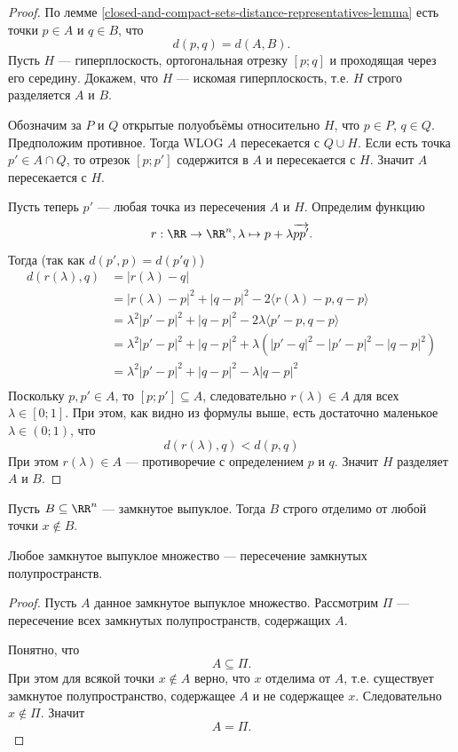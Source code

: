 \documentclass[12pt,a4paper]{article}
\begin{document}
    \begin{proof}
        По лемме \ref{closed-and-compact-sets-distance-representatives-lemma} есть точки $p \in A$ и $q \in B$, что
        \[d(p, q) = d(A, B).\]
        Пусть $H$ --- гиперплоскость, ортогональная отрезку $[p;q]$ и проходящая через его середину. Докажем, что $H$ --- искомая гиперплоскость, т.е. $H$ строго разделяется $A$ и $B$.

        Обозначим за $P$ и $Q$ открытые полуобъёмы относительно $H$, что $p \in P$, $q \in Q$. Предположим противное. Тогда WLOG $A$ пересекается с $Q \cup H$. Если есть точка $p' \in A \cap Q$, то отрезок $[p;p']$ содержится в $A$ и пересекается с $H$. Значит $A$ пересекается с $H$.

        Пусть теперь $p'$ --- любая точка из пересечения $A$ и $H$. Определим функцию
        \[r: \RR \to \RR^n, \lambda \mapsto p + \lambda \overrightarrow{pp'}.\]
        Тогда (так как $d(p', p) = d(p' q)$)
        \begin{align*}
            d(r(\lambda), q)
            &= |r(\lambda) - q|\\
            &= |r(\lambda) - p|^2 + |q - p|^2 - 2\langle r(\lambda) - p, q - p \rangle\\
            &= \lambda^2 |p' - p|^2 + |q - p|^2 - 2 \lambda \langle p' - p, q - p \rangle\\
            &= \lambda^2 |p' - p|^2 + |q - p|^2 + \lambda(|p' - q|^2 - |p' - p|^2 - |q - p|^2)\\
            &= \lambda^2 |p' - p|^2 + |q - p|^2 - \lambda|q - p|^2\\
        \end{align*}
        Поскольку $p, p' \in A$, то $[p; p'] \subseteq A$, следовательно $r(\lambda) \in A$ для всех $\lambda \in [0; 1]$. При этом, как видно из формулы выше, есть достаточно маленькое $\lambda \in (0; 1)$, что
        \[d(r(\lambda), q) < d(p, q)\]
        При этом $r(\lambda) \in A$ --- противоречие с определением $p$ и $q$. Значит $H$ разделяет $A$ и $B$.
    \end{proof}

    \begin{corollary}
        Пусть $B \subseteq \RR^n$ --- замкнутое выпуклое. Тогда $B$ строго отделимо от любой точки $x \notin B$.
    \end{corollary}

    \begin{corollary}
        Любое замкнутое выпуклое множество --- пересечение замкнутых полупространств.
    \end{corollary}

    \begin{proof}
        Пусть $A$ данное замкнутое выпуклое множество. Рассмотрим $\Pi$ --- пересечение всех замкнутых полупространств, содержащих $A$.

        Понятно, что
        \[A \subseteq \Pi.\]
        При этом для всякой точки $x \notin A$ верно, что $x$ отделима от $A$, т.е. существует замкнутое полупространство, содержащее $A$ и не содержащее $x$. Следовательно $x \notin \Pi$. Значит
        \[A = \Pi.\]
    \end{proof}

    
\end{document}
